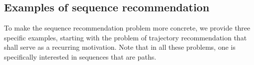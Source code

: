 \subsection{Examples of sequence recommendation}
\label{sec:trajrec}

To make the sequence recommendation problem more concrete,
we provide three specific examples,
starting with the problem of trajectory recommendation
that shall serve as a recurring motivation.
Note that in all these problems, one is specifically interested in sequences that are paths.


